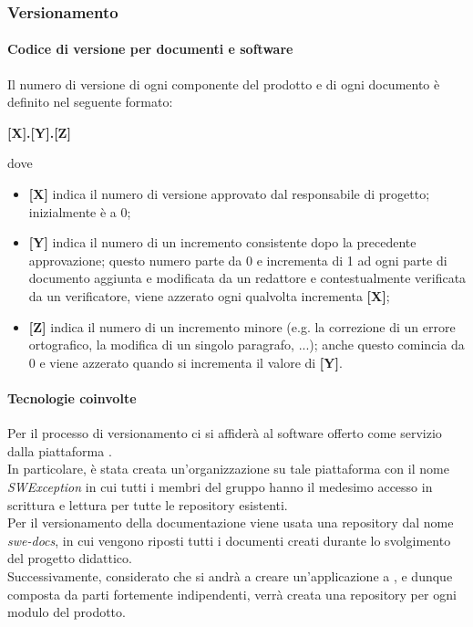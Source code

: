 \subsubsection{Versionamento}
\paragraph{Codice di versione per documenti e software}
Il numero di versione di ogni componente del prodotto e di ogni documento è definito nel seguente formato:
\begin{center}
    \textbf{[X].[Y].[Z]}
\end{center}
dove
\begin{itemize}
    \item \textbf{[X]} indica il numero di versione approvato dal responsabile di progetto; inizialmente è a 0;
    \item \textbf{[Y]} indica il numero di un incremento consistente dopo la precedente approvazione; questo numero parte da
          0 e incrementa di 1 ad ogni parte di documento aggiunta e modificata da un redattore e contestualmente verificata da un verificatore,
          viene azzerato ogni qualvolta incrementa \textbf{[X]};
    \item \textbf{[Z]} indica il numero di un incremento minore (e.g. la correzione di un errore ortografico, la modifica di un singolo paragrafo, ...);
          anche questo comincia da 0 e viene azzerato quando si incrementa il valore di \textbf{[Y]}.
\end{itemize}

\paragraph{Tecnologie coinvolte}
Per il processo di versionamento ci si affiderà al software  offerto come servizio dalla piattaforma .\\
In particolare, è stata creata un'organizzazione su tale piattaforma con il nome \textit{SWException} in cui tutti i membri del gruppo
hanno il medesimo accesso in scrittura e lettura per tutte le repository esistenti.\\
Per il versionamento della documentazione viene usata una repository dal nome \textit{swe-docs}, in cui vengono riposti tutti i
documenti creati durante lo svolgimento del progetto didattico.\\
Successivamente,  considerato che si andrà a creare un'applicazione a , e dunque composta da parti fortemente indipendenti,
verrà creata una repository per ogni modulo del prodotto.

